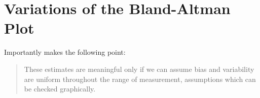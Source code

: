 \documentclass[12pt, a4paper]{report}
\theoremstyle{plain}
\theoremstyle{definition}
\theoremstyle{remark}
\begin{document}

	



	
	
\section{Variations of the Bland-Altman Plot} 
Importantly \citet{BA99} makes the following point:
\begin{quote}These estimates are meaningful only if we can assume
	bias and variability are uniform throughout the range of
	measurement, assumptions which can be checked graphically.
\end{quote}
\end{document}
